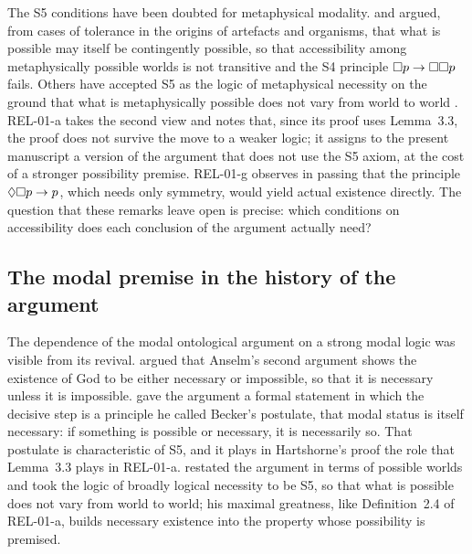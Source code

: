 \documentclass{situationist-preprint}
\begin{document}
The S5 conditions have been doubted for metaphysical modality. \citet{Chandler1976} and \citet{Salmon1989} argued, from cases of tolerance in the origins of artefacts and organisms, that what is possible may itself be contingently possible, so that accessibility among metaphysically possible worlds is not transitive and the S4 principle $\mathord{\Box} p \to \mathord{\Box}\mathord{\Box} p$ fails. Others have accepted S5 as the logic of metaphysical necessity on the ground that what is metaphysically possible does not vary from world to world \citep{Williamson2013}. REL-01-a takes the second view and notes that, since its proof uses Lemma~3.3, the proof does not survive the move to a weaker logic; it assigns to the present manuscript a version of the argument that does not use the S5 axiom, at the cost of a stronger possibility premise. REL-01-g observes in passing that the principle $\mathord{\Diamond}\mathord{\Box} p \to p$, which needs only symmetry, would yield actual existence directly. The question that these remarks leave open is precise: which conditions on accessibility does each conclusion of the argument actually need?

\subsection{The modal premise in the history of the argument}

The dependence of the modal ontological argument on a strong modal logic was visible from its revival. \citet{Malcolm1960} argued that Anselm's second argument shows the existence of God to be either necessary or impossible, so that it is necessary unless it is impossible. \citet{Hartshorne1962} gave the argument a formal statement in which the decisive step is a principle he called Becker's postulate, that modal status is itself necessary: if something is possible or necessary, it is necessarily so. That postulate is characteristic of S5, and it plays in Hartshorne's proof the role that Lemma~3.3 plays in REL-01-a. \citet{Plantinga1974} restated the argument in terms of possible worlds and took the logic of broadly logical necessity to be S5, so that what is possible does not vary from world to world; his maximal greatness, like Definition~2.4 of REL-01-a, builds necessary existence into the property whose possibility is premised.
\end{document}
